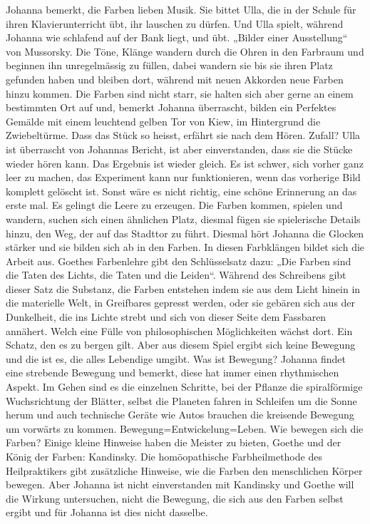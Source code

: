 Johanna bemerkt, die Farben lieben Musik. Sie bittet Ulla, die in der Schule für ihren Klavierunterricht übt, ihr lauschen zu dürfen. Und Ulla spielt, während Johanna wie schlafend auf der Bank liegt, und übt. „Bilder einer Ausstellung“ von Mussorsky. Die Töne, Klänge wandern durch die Ohren in den Farbraum und beginnen ihn unregelmässig zu füllen, dabei wandern sie bis sie ihren Platz gefunden haben und bleiben dort, während mit neuen Akkorden neue Farben hinzu kommen. Die Farben sind nicht starr, sie halten sich aber gerne an einem bestimmten Ort auf und, bemerkt Johanna überrascht, bilden ein Perfektes Gemälde mit einem leuchtend gelben Tor von Kiew, im Hintergrund die Zwiebeltürme. Dass  das Stück so heisst, erfährt sie nach dem Hören.
Zufall? Ulla ist überrascht von Johannas Bericht, ist aber einverstanden, dass sie die Stücke wieder hören kann. Das Ergebnis ist wieder gleich. Es ist schwer, sich vorher ganz leer zu machen, das Experiment kann nur funktionieren, wenn das vorherige Bild komplett gelöscht ist. Sonst wäre es nicht richtig, eine schöne Erinnerung an das erste mal.
Es gelingt die Leere zu erzeugen. Die Farben kommen, spielen und wandern, suchen sich einen ähnlichen Platz, diesmal fügen sie spielerische Details hinzu, den Weg, der auf das Stadttor zu führt. Diesmal hört Johanna die Glocken stärker und sie bilden sich ab in den Farben.
In diesen Farbklängen bildet sich die Arbeit aus. Goethes Farbenlehre gibt den Schlüsselsatz dazu: „Die Farben sind die Taten des Lichts, die Taten und die Leiden“. Während des Schreibens gibt dieser Satz die Substanz, die Farben entstehen indem sie aus dem Licht hinein in die materielle Welt, in Greifbares gepresst werden, oder sie gebären sich aus der Dunkelheit, die ins Lichte strebt und sich von dieser Seite dem Fassbaren annähert. Welch eine Fülle von philosophischen Möglichkeiten wächst dort. Ein Schatz, den es zu bergen gilt.
Aber aus diesem Spiel ergibt sich keine Bewegung und die ist es, die alles Lebendige umgibt. Was ist Bewegung? Johanna findet eine strebende Bewegung und bemerkt, diese hat immer einen rhythmischen Aspekt. Im Gehen sind es die einzelnen Schritte, bei der Pflanze die spiralförmige Wuchsrichtung der Blätter, selbst die Planeten fahren in Schleifen um die Sonne herum und auch technische Geräte wie Autos brauchen die kreisende Bewegung um vorwärts zu kommen.
Bewegung=Entwickelung=Leben.
Wie bewegen sich die Farben? Einige kleine Hinweise haben die Meister zu bieten, Goethe und der König der Farben: Kandinsky. Die homöopathische Farbheilmethode des Heilpraktikers gibt zusätzliche Hinweise, wie die Farben den menschlichen Körper bewegen. Aber Johanna ist nicht einverstanden mit Kandinsky und Goethe will die Wirkung untersuchen, nicht die Bewegung, die sich aus den Farben selbst ergibt und für Johanna ist dies nicht dasselbe. 
